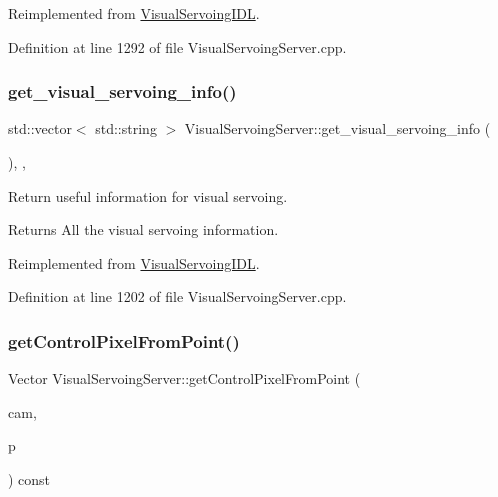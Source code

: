 Reimplemented from \hyperlink{classVisualServoingIDL_afb359486a7e42bfda3ddf66a2e518e90}{Visual\+Servoing\+I\+DL}.



Definition at line 1292 of file Visual\+Servoing\+Server.\+cpp.

\mbox{\label{classVisualServoingServer_af085e2c5d4c4cfe940b3564b4ba69af6}} 
\subsubsection{\texorpdfstring{get\+\_\+visual\+\_\+servoing\+\_\+info()}{get\_visual\_servoing\_info()}}
{\footnotesize\ttfamily std\+::vector$<$ std\+::string $>$ Visual\+Servoing\+Server\+::get\+\_\+visual\+\_\+servoing\+\_\+info (\begin{DoxyParamCaption}{ }\end{DoxyParamCaption})\hspace{0.3cm}{\ttfamily [override]}, {\ttfamily [protected]}, {\ttfamily [virtual]}}



Return useful information for visual servoing. 

\begin{DoxyReturn}{Returns}
All the visual servoing information. 
\end{DoxyReturn}


Reimplemented from \hyperlink{classVisualServoingIDL_a9654ec3984d53b41f50e0d70b2991203}{Visual\+Servoing\+I\+DL}.



Definition at line 1202 of file Visual\+Servoing\+Server.\+cpp.

\mbox{\label{classVisualServoingServer_a43cf45e933a71214cfb4d8248005761e}} 
\subsubsection{\texorpdfstring{get\+Control\+Pixel\+From\+Point()}{getControlPixelFromPoint()}}
{\footnotesize\ttfamily Vector Visual\+Servoing\+Server\+::get\+Control\+Pixel\+From\+Point (\begin{DoxyParamCaption}\item[{const Cam\+Sel \&}]{cam,  }\item[{const yarp\+::sig\+::\+Vector \&}]{p }\end{DoxyParamCaption}) const\hspace{0.3cm}{\ttfamily [private]}}



